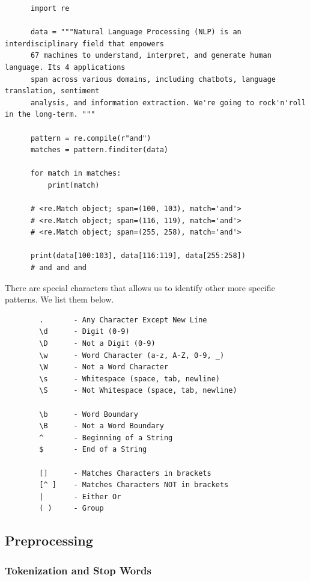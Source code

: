 \documentclass{article}
\begin{document}
    \begin{lstlisting} 
      import re 

      data = """Natural Language Processing (NLP) is an interdisciplinary field that empowers 
      67 machines to understand, interpret, and generate human language. Its 4 applications 
      span across various domains, including chatbots, language translation, sentiment 
      analysis, and information extraction. We're going to rock'n'roll in the long-term. """ 

      pattern = re.compile(r"and")
      matches = pattern.finditer(data) 

      for match in matches: 
          print(match) 
          
      # <re.Match object; span=(100, 103), match='and'>
      # <re.Match object; span=(116, 119), match='and'>
      # <re.Match object; span=(255, 258), match='and'>

      print(data[100:103], data[116:119], data[255:258])
      # and and and
    \end{lstlisting}

    There are special characters that allows us to identify other more specific patterns. We list them below. 
    \begin{lstlisting}
        .       - Any Character Except New Line
        \d      - Digit (0-9)
        \D      - Not a Digit (0-9)
        \w      - Word Character (a-z, A-Z, 0-9, _)
        \W      - Not a Word Character
        \s      - Whitespace (space, tab, newline)
        \S      - Not Whitespace (space, tab, newline)
        
        \b      - Word Boundary
        \B      - Not a Word Boundary
        ^       - Beginning of a String
        $       - End of a String
        
        []      - Matches Characters in brackets
        [^ ]    - Matches Characters NOT in brackets
        |       - Either Or
        ( )     - Group
    \end{lstlisting}

  \subsection{Preprocessing}

    \subsubsection{Tokenization and Stop Words}
\end{document}
